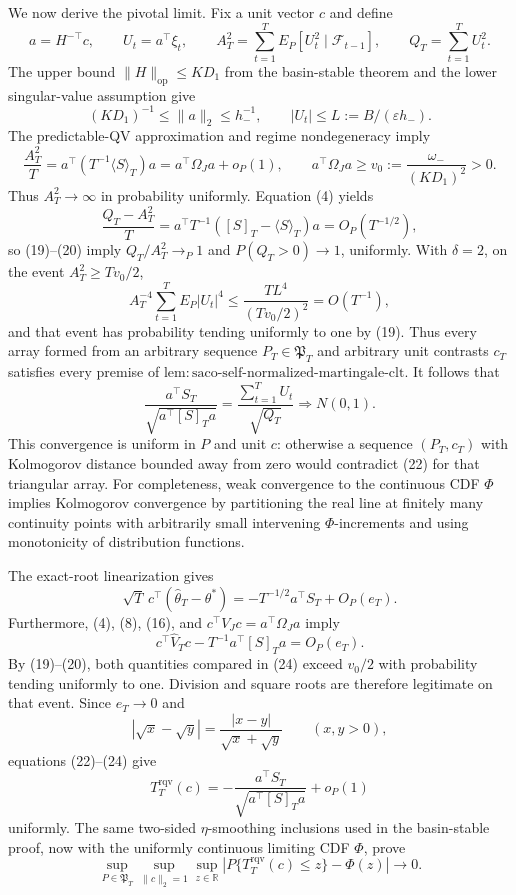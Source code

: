 We now derive the pivotal limit. Fix a unit vector \(c\) and define
\[
 a=H^{-\top}c,
 \qquad U_t=a^\top\xi_t,
 \qquad A_T^2=\sum_{t=1}^TE_P[U_t^2\mid\mathcal F_{t-1}],
 \qquad Q_T=\sum_{t=1}^TU_t^2. \tag{17}
\]
The upper bound \(\|H\|_{\mathrm{op}}\le KD_1\) from the basin-stable theorem and the lower singular-value assumption give
\[
 (KD_1)^{-1}\le\|a\|_2\le h_-^{-1},
 \qquad |U_t|\le L:=B/(\varepsilon h_-). \tag{18}
\]
The predictable-QV approximation and regime nondegeneracy imply
\[
 \frac{A_T^2}{T}
 =a^\top(T^{-1}\langle S\rangle_T)a
 =a^\top\Omega_Ja+o_P(1),
 \qquad a^\top\Omega_Ja\ge v_0:=\frac{\omega_-}{(KD_1)^2}>0. \tag{19}
\]
Thus \(A_T^2\to\infty\) in probability uniformly. Equation (4) yields
\[
 \frac{Q_T-A_T^2}{T}
 =a^\top T^{-1}([S]_T-\langle S\rangle_T)a
 =O_P(T^{-1/2}), \tag{20}
\]
so (19)--(20) imply \(Q_T/A_T^2\to_P1\) and \(P(Q_T>0)\to1\), uniformly. With \(\delta=2\), on the event \(A_T^2\ge Tv_0/2\),
\[
 A_T^{-4}\sum_{t=1}^TE_P|U_t|^4
 \le \frac{TL^4}{(Tv_0/2)^2}=O(T^{-1}), \tag{21}
\]
and that event has probability tending uniformly to one by (19). Thus every array formed from an arbitrary sequence \(P_T\in\mathfrak P_T\) and arbitrary unit contrasts \(c_T\) satisfies every premise of \(\mathrm{lem:saco\text{-}self\text{-}normalized\text{-}martingale\text{-}clt}\). It follows that
\[
 \frac{a^\top S_T}{\sqrt{a^\top[S]_Ta}}
 =\frac{\sum_{t=1}^TU_t}{\sqrt{Q_T}}
 \Rightarrow N(0,1). \tag{22}
\]
This convergence is uniform in \(P\) and unit \(c\): otherwise a sequence \((P_T,c_T)\) with Kolmogorov distance bounded away from zero would contradict (22) for that triangular array. For completeness, weak convergence to the continuous CDF \(\Phi\) implies Kolmogorov convergence by partitioning the real line at finitely many continuity points with arbitrarily small intervening \(\Phi\)-increments and using monotonicity of distribution functions.

The exact-root linearization gives
\[
 \sqrt T\,c^\top(\widehat\theta_T-\theta^*)
 =-T^{-1/2}a^\top S_T+O_P(e_T). \tag{23}
\]
Furthermore, (4), (8), (16), and \(c^\top V_Jc=a^\top\Omega_Ja\) imply
\[
 c^\top\widehat V_Tc-T^{-1}a^\top[S]_Ta=O_P(e_T). \tag{24}
\]
By (19)--(20), both quantities compared in (24) exceed \(v_0/2\) with probability tending uniformly to one. Division and square roots are therefore legitimate on that event. Since \(e_T\to0\) and
\[
 |\sqrt x-\sqrt y|=\frac{|x-y|}{\sqrt x+\sqrt y}\qquad(x,y>0),
\]
equations (22)--(24) give
\[
 T_T^{\mathrm{rqv}}(c)
 =-\frac{a^\top S_T}{\sqrt{a^\top[S]_Ta}}+o_P(1) \tag{25}
\]
uniformly. The same two-sided \(\eta\)-smoothing inclusions used in the basin-stable proof, now with the uniformly continuous limiting CDF \(\Phi\), prove
\[
 \sup_{P\in\mathfrak P_T}\sup_{\|c\|_2=1}\sup_{z\in\mathbb R}
 \left|P\{T_T^{\mathrm{rqv}}(c)\le z\}-\Phi(z)\right|
 \longrightarrow0. \tag{26}
\]

